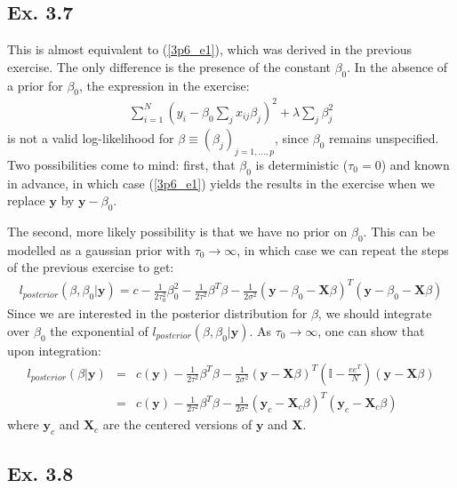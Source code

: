 \subsection*{Ex. 3.7}
This is almost equivalent to (\ref{3p6_e1}), which was derived in the previous exercise.
The only difference is the presence of the constant $\beta_0$. In the absence of a prior for $\beta_0$,
the expression in the exercise:
\begin{eqnarray*}
\sum_{i=1}^N \left( y_i -\beta_0 \sum_j x_{ij} \beta_j \right)^2 + \lambda \sum_j \beta_j^2
\end{eqnarray*}
is not a valid log-likelihood for $\beta \equiv (\beta_j)_{j=1,\ldots,p}$, since $\beta_0$ remains
unspecified. Two possibilities come to mind: first, that $\beta_0$ is deterministic ($\tau_0 = 0$) 
and known in advance, in which case (\ref{3p6_e1}) yields the results in the exercise
when we replace $\mathbf{y}$ by $\mathbf{y} - \beta_0$. 

The second, more likely possibility is that we have no prior on $\beta_0$. This can be modelled as
a gaussian prior with $\tau_0 \rightarrow \infty$, in which case we can repeat the steps of the 
previous exercise to get:
\begin{eqnarray*}
l_{posterior}(\beta, \beta_0 | \mathbf{y}) = c - \frac{1}{2 \tau_0^2} \beta_0^2 - \frac{1}{2 \tau^2} \beta^T \beta - \frac{1}{2 \sigma^2} \left( \mathbf{y} - \beta_0 - \mathbf{X} \beta \right)^T \left( \mathbf{y}- \beta_0 - \mathbf{X} \beta \right)
\end{eqnarray*}
Since we are interested in the posterior distribution for $\beta$, we should integrate over $\beta_0$ the exponential of $l_{posterior}(\beta, \beta_0 | \mathbf{y})$. As $\tau_0 \rightarrow \infty$, one can
show that upon integration:
\begin{eqnarray*}
	l_{posterior}(\beta | \mathbf{y}) & = & c(\mathbf{y}) - \frac{1}{2 \tau^2} \beta^T \beta - \frac{1}{2 \sigma^2} \left( \mathbf{y} - \mathbf{X} \beta \right)^T \left( \mathbb{I} - \frac{e e^T}{N} \right)\left( \mathbf{y}  - \mathbf{X} \beta \right) \\
	& = & c(\mathbf{y}) - \frac{1}{2 \tau^2} \beta^T \beta - \frac{1}{2 \sigma^2} \left( \mathbf{y}_c - \mathbf{X}_c \beta \right)^T \left( \mathbf{y}_c  - \mathbf{X}_c \beta \right)
\end{eqnarray*}
where $\mathbf{y}_c$ and $\mathbf{X}_c$ are the centered versions of $\mathbf{y}$ and $\mathbf{X}$.

\subsection*{{\color{red}Ex. 3.8}}

